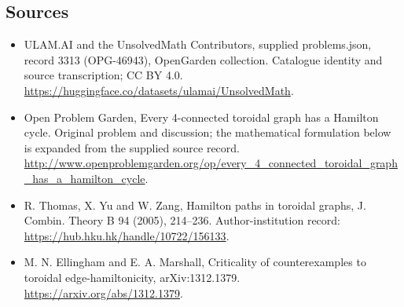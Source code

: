 \documentclass[11pt,a4paper]{article}
\begin{document}
\subsection{Sources}
\begin{itemize}
\item[S1] ULAM.AI and the UnsolvedMath Contributors, supplied problems.json, record 3313 (OPG-46943), OpenGarden collection. Catalogue identity and source transcription; CC BY 4.0.
\url{https://huggingface.co/datasets/ulamai/UnsolvedMath}.
\item[S2] Open Problem Garden, Every 4-connected toroidal graph has a Hamilton cycle. Original problem and discussion; the mathematical formulation below is expanded from the supplied source record.
\url{http://www.openproblemgarden.org/op/every_4_connected_toroidal_graph_has_a_hamilton_cycle}.

\item[R1] R. Thomas, X. Yu and W. Zang, Hamilton paths in toroidal graphs,
J. Combin. Theory B 94 (2005), 214--236. Author-institution record:
\url{https://hub.hku.hk/handle/10722/156133}.
\item[R2] M. N. Ellingham and E. A. Marshall, Criticality of counterexamples
to toroidal edge-hamiltonicity, arXiv:1312.1379.
\url{https://arxiv.org/abs/1312.1379}.

\end{itemize}
\end{document}
